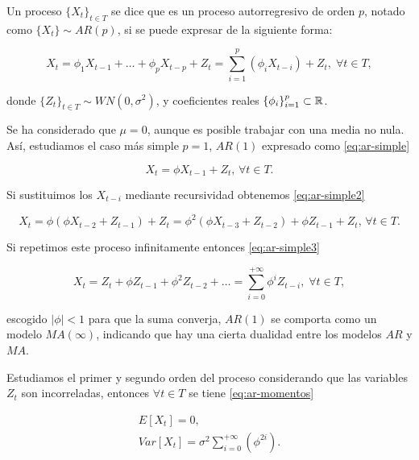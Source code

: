 \begin{definicion}
  Un proceso $\{X_t\}_{t \in T}$ se dice que es un proceso autorregresivo de orden $p$, notado como $\{X_t\} \sim AR(p)$, si se puede expresar de la siguiente forma:

  $$X_t = \phi_1 X_{t-1} + \ldots + \phi_p X_{t - p} + Z_t = \sum \limits^p_{i = 1} \left(\phi_i X_{t - i}\right) + Z_t, \; \forall t \in T,$$

  donde $\{Z_t\}_{t \in T} \sim WN(0, \sigma^2)$, y coeficientes reales $\{\phi_i\}_{i = 1}^p \subset \mathbb{R}$.
  \label{def:proceso-autorregresivo}
\end{definicion}

Se ha considerado que $\mu = 0$, aunque es posible trabajar con una media no nula. Así, estudiamos el caso más simple $p = 1$, $AR(1)$ expresado como \eqref{eq:ar-simple}

\begin{equation}
  X_t = \phi X_{t - 1} + Z_t, \, \forall t \in T.
  \label{eq:ar-simple}
\end{equation}

Si sustituimos los $X_{t - i}$ mediante recursividad obtenemos \eqref{eq:ar-simple2}

\begin{equation}
  X_t = \phi\left(\phi X_{t-2} + Z_{t-1}\right) + Z_t = \phi^2\left(\phi X_{t-3} + Z_{t-2}\right) + \phi Z_{t-1} + Z_t, \, \forall t \in T.
  \label{eq:ar-simple2}
\end{equation}

Si repetimos este proceso infinitamente entonces \eqref{eq:ar-simple3}

\begin{equation}
  X_t = Z_t + \phi Z_{t-1} + \phi^2 Z_{t-2} + \ldots = \sum \limits^{+\infty}_{i = 0} \phi^i Z_{t - i}, \; \forall t \in T,
  \label{eq:ar-simple3}
\end{equation}

escogido $|\phi| < 1$ para que la suma converja, $AR(1)$ se comporta como un modelo $MA(\infty)$, indicando que hay una cierta dualidad entre los modelos $AR$ y $MA$.

Estudiamos el primer y segundo orden del proceso considerando que las variables $Z_t$ son incorreladas, entonces $\forall t \in T$ se tiene \eqref{eq:ar-momentos}

\begin{gather}
  E[X_t] = 0, \\
  Var[X_t] = \sigma^2 \sum \limits^{+\infty}_{i = 0} \left(\phi^{2i}\right).
  \label{eq:ar-momentos}
\end{gather}

